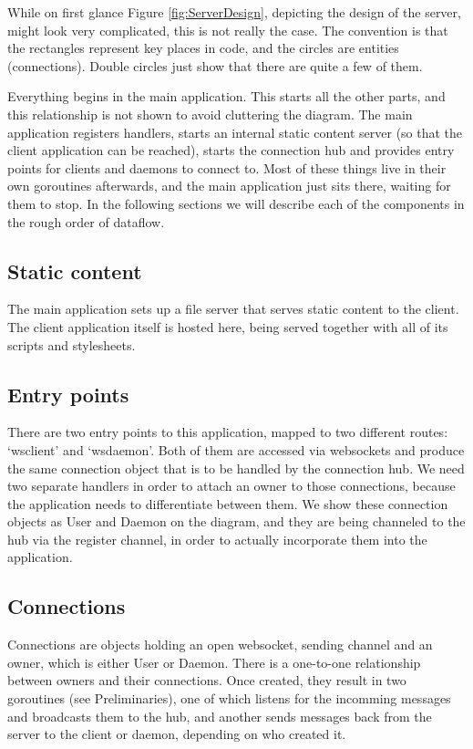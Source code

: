 \documentclass{l3proj}
\begin{document}
While on first glance Figure \ref{fig:ServerDesign}, depicting the design of the server, might look very complicated, this is not really the case. The convention is that the rectangles represent key places in code, and the circles are entities (connections). Double circles just show that there are quite a few of them. 

Everything begins in the main application. This starts all the other parts, and this relationship is not shown to avoid cluttering the diagram. The main application registers handlers, starts an internal static content server (so that the client application can be reached), starts the connection hub and provides entry points for clients and daemons to connect to. Most of these things live in their own goroutines afterwards, and the main application just sits there, waiting for them to stop. In the following sections we will describe each of the components in the rough order of dataflow.

\subsection{Static content}

The main application sets up a file server that serves static content to the client. The client application itself is hosted here, being served together with all of its scripts and stylesheets.

\subsection{Entry points}

There are two entry points to this application, mapped to two different routes: `wsclient' and `wsdaemon'. Both of them are accessed via websockets and produce the same connection object that is to be handled by the connection hub. We need two separate handlers in order to attach an owner to those connections, because the application needs to differentiate between them. We show these connection objects as User and Daemon on the diagram, and they are being channeled to the hub via the register channel, in order to actually incorporate them into the application.

\subsection{Connections}

Connections are objects holding an open websocket, sending channel and an owner, which is either User or Daemon. There is a one-to-one relationship between owners and their connections. Once created, they result in two goroutines (see Preliminaries), one of which listens for the incomming messages and broadcasts them to the hub, and another sends messages back from the server to the client or daemon, depending on who created it.
\end{document}
